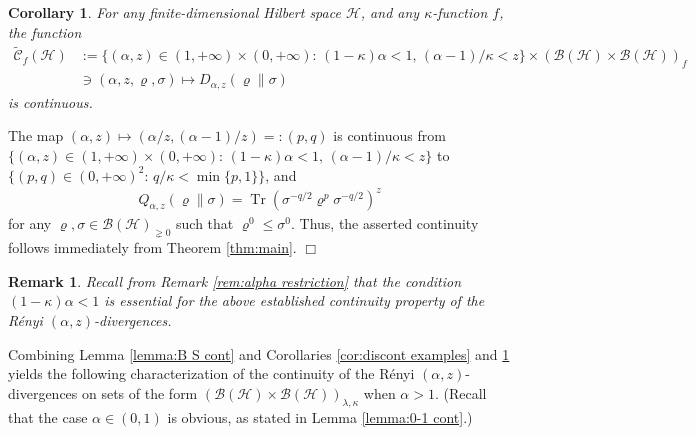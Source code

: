 \documentclass[unsortedaddress,superscriptaddress,pra,notitlepage]{revtex4}
\newtheorem{rem}[definition]{Remark}
\newtheorem{cor}[definition]{Corollary}
\newenvironment{proof}[1][Proof]{\begin{trivlist}
\item[\hskip \labelsep {\bfseries #1}]}{\hfill$\Box$\end{trivlist}}
\def\B{{\mathcal B}}
\def\C{{\mathcal C}}
\def\rho{\varrho}
\def\hil{{\mathcal H}}
\def\pne{_{\gneq 0}}
\def\pwr{\kappa}
\DeclareMathOperator{\id}{id}
\DeclareMathOperator{\Tr}{Tr}
\begin{document}
\begin{cor}\label{cor:az-continuity}
For any finite-dimensional Hilbert space $\hil$, and any $\pwr$-function $f$, 
the function
\begin{align*}%
\tilde\C_{f}(\hil)&:=
\{(\alpha,z)\in(1,+\infty)\times(0,+\infty):\,(1-\pwr)\alpha<1,\,(\alpha-1)/\pwr<z\}
\times
(\B(\hil)\times\B(\hil))_{f}\\
&\ni(\alpha,z,\rho,\sigma)
\mapsto D_{\alpha,z}(\rho\|\sigma)
\end{align*}
is continuous. 
\end{cor}
\begin{proof}
The map $(\alpha,z)\mapsto (\alpha/z,(\alpha-1)/z)=:(p,q)$ is continuous from 
$\{(\alpha,z)\in(1,+\infty)\times(0,+\infty):\,(1-\pwr)\alpha<1,\,(\alpha-1)/\pwr<z\}$ to
$\{(p,q)\in(0,+\infty)^2:\,q/\pwr<\min\{p,1\}\}$, and 
\begin{align*}
Q_{\alpha,z}(\rho\|\sigma)=\Tr(\sigma^{-q/2}\rho^p\sigma^{-q/2})^z
\end{align*}
for any $\rho,\sigma\in\B(\hil)\pne$ such that $\rho^0\le\sigma^0$.
Thus, the 
asserted continuity follows immediately from Theorem \ref{thm:main}.
\end{proof}

\begin{rem}
Recall from Remark \ref{rem:alpha restriction}
that the condition $(1-\pwr)\alpha<1$ is essential for the 
above established continuity 
property of the R\'enyi $(\alpha,z)$-divergences.
\end{rem}

Combining Lemma \ref{lemma:B S cont} and Corollaries \ref{cor:discont examples} and \ref{cor:az-continuity} yields
the following characterization of the continuity of the R\'enyi $(\alpha,z)$-divergences
on sets of the form $(\B(\hil)\times\B(\hil))_{\lambda,\pwr}$ when $\alpha>1$. 
(Recall that the case $\alpha\in(0,1)$ is obvious, as stated in Lemma \ref{lemma:0-1 cont}.)
\end{document}
